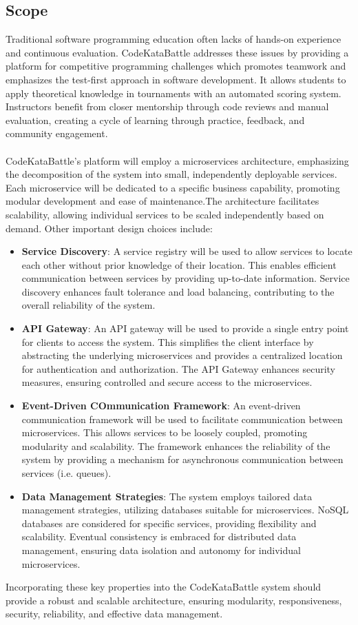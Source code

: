 \subsection{Scope}
Traditional software programming education often lacks of hands-on experience and continuous evaluation. CodeKataBattle addresses these issues by providing a platform for competitive programming challenges which promotes teamwork and emphasizes the test-first approach in software development. It allows students to apply theoretical knowledge in tournaments with an automated scoring system. Instructors benefit from closer mentorship through code reviews and manual evaluation, creating a cycle of learning through practice, feedback, and community engagement.
\\\\CodeKataBattle's platform will employ a microservices architecture, emphasizing the decomposition of the system into small, independently deployable services. Each microservice will be dedicated to a specific business capability, promoting modular development and ease of maintenance.The architecture facilitates scalability, allowing individual services to be scaled independently based on demand.
Other important design choices include:
\begin{itemize}
    \item \textbf{Service Discovery}: A service registry will be used to allow services to locate each other without prior knowledge of their location. This enables efficient communication between services by providing up-to-date information. Service discovery enhances fault tolerance and load balancing, contributing to the overall reliability of the system.
    \item \textbf{API Gateway}: An API gateway will be used to provide a single entry point for clients to access the system. This simplifies the client interface by abstracting the underlying microservices and provides a centralized location for authentication and authorization. The API Gateway enhances security measures, ensuring controlled and secure access to the microservices.
    \item \textbf{Event-Driven COmmunication Framework}: An event-driven communication framework will be used to facilitate communication between microservices. This allows services to be loosely coupled, promoting modularity and scalability. The framework enhances the reliability of the system by providing a mechanism for asynchronous communication between services (i.e. queues).
    \item \textbf{Data Management Strategies}: The system employs tailored data management strategies, utilizing databases suitable for microservices. NoSQL databases are considered for specific services, providing flexibility and scalability. Eventual consistency is embraced for distributed data management, ensuring data isolation and autonomy for individual microservices.
\end{itemize}
Incorporating these key properties into the CodeKataBattle system should provide a robust and scalable architecture, ensuring modularity, responsiveness, security, reliability, and effective data management.

